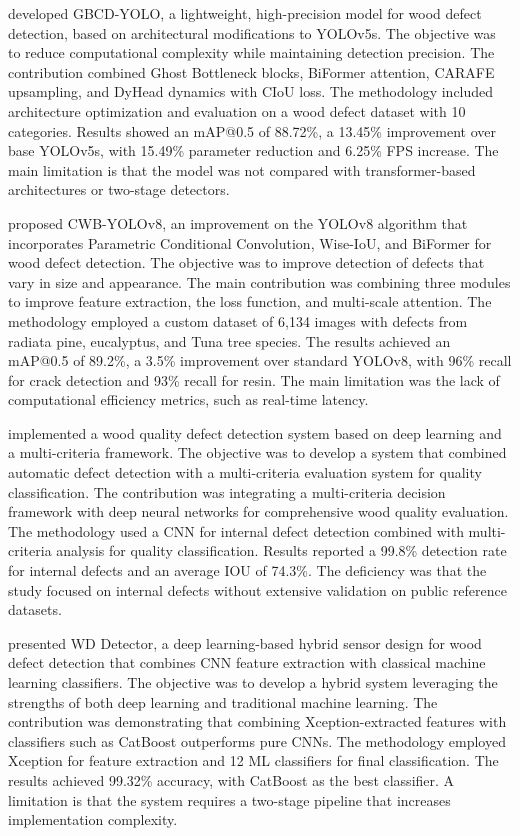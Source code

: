 \documentclass[pdflatex,sn-basic,Numbered,iicol]{sn-jnl}
\begin{document}
\citet{zheng2024gbcdyolo} developed GBCD-YOLO, a lightweight, high-precision model for wood defect detection, based on architectural modifications to YOLOv5s. The objective was to reduce computational complexity while maintaining detection precision. The contribution combined Ghost Bottleneck blocks, BiFormer attention, CARAFE upsampling, and DyHead dynamics with CIoU loss. The methodology included architecture optimization and evaluation on a wood defect dataset with 10 categories. Results showed an mAP@0.5 of 88.72\%, a 13.45\% improvement over base YOLOv5s, with 15.49\% parameter reduction and 6.25\% FPS increase. The main limitation is that the model was not compared with transformer-based architectures or two-stage detectors.

\citet{cwbyolo2024} proposed CWB-YOLOv8, an improvement on the YOLOv8 algorithm that incorporates Parametric Conditional Convolution, Wise-IoU, and BiFormer for wood defect detection. The objective was to improve detection of defects that vary in size and appearance. The main contribution was combining three modules to improve feature extraction, the loss function, and multi-scale attention. The methodology employed a custom dataset of 6,134 images with defects from radiata pine, eucalyptus, and Tuna tree species. The results achieved an mAP@0.5 of 89.2\%, a 3.5\% improvement over standard YOLOv8, with 96\% recall for crack detection and 93\% recall for resin. The main limitation was the lack of computational efficiency metrics, such as real-time latency.

\citet{wood2022multicriteria} implemented a wood quality defect detection system based on deep learning and a multi-criteria framework. The objective was to develop a system that combined automatic defect detection with a multi-criteria evaluation system for quality classification. The contribution was integrating a multi-criteria decision framework with deep neural networks for comprehensive wood quality evaluation. The methodology used a CNN for internal defect detection combined with multi-criteria analysis for quality classification. Results reported a 99.8\% detection rate for internal defects and an average IOU of 74.3\%. The deficiency was that the study focused on internal defects without extensive validation on public reference datasets.

\citet{kilic2025wd} presented WD Detector, a deep learning-based hybrid sensor design for wood defect detection that combines CNN feature extraction with classical machine learning classifiers. The objective was to develop a hybrid system leveraging the strengths of both deep learning and traditional machine learning. The contribution was demonstrating that combining Xception-extracted features with classifiers such as CatBoost outperforms pure CNNs. The methodology employed Xception for feature extraction and 12 ML classifiers for final classification. The results achieved 99.32\% accuracy, with CatBoost as the best classifier. A limitation is that the system requires a two-stage pipeline that increases implementation complexity.
\end{document}
